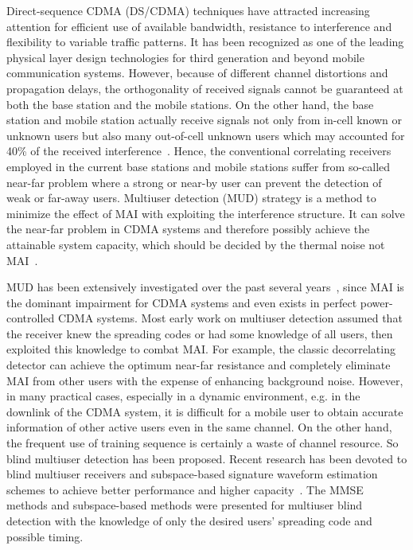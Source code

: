 \documentclass[a4paper,11pt,fleqn]{article}
\begin{document}
Direct-sequence CDMA (DS/CDMA) techniques have attracted
increasing attention for efficient use of available bandwidth,
resistance to interference and flexibility to variable traffic
patterns. It has been recognized as one of the leading physical
layer design technologies for third generation and beyond mobile
communication systems. However, because of different channel
distortions and propagation delays, the orthogonality of received
signals cannot be guaranteed at both the base station and the
mobile stations. On the other hand, the base station and mobile
station actually receive signals not only from in-cell known or
unknown users but also many out-of-cell unknown users which may
accounted for 40\% of the received interference~\cite{Viterbi95}.
Hence, the conventional correlating receivers employed in the
current base stations and mobile stations suffer from so-called
near-far problem where a strong or near-by user can prevent the
detection of weak or far-away users. Multiuser detection (MUD)
strategy is a method to minimize the effect of MAI with exploiting
the interference structure. It can solve the near-far problem in
CDMA systems and therefore possibly achieve the attainable system
capacity, which should be decided by the thermal noise not
MAI~\cite{Verd86}.

MUD has been extensively investigated over the past several
years~\cite{Verd98}, since MAI is the dominant impairment for CDMA
systems and even exists in perfect power-controlled CDMA systems.
Most early work on multiuser detection assumed that the receiver
knew the spreading codes or had some knowledge of all users, then
exploited this knowledge to combat MAI. For example, the classic
decorrelating detector can achieve the optimum near-far resistance
and completely eliminate MAI from other users with the expense of
enhancing background noise. However, in many practical cases,
especially in a dynamic environment, e.g. in the downlink of the
CDMA system, it is difficult for a mobile user to obtain accurate
information of other active users even in the same channel. On the
other hand, the frequent use of training sequence is certainly a
waste of channel resource. So blind multiuser detection has been
proposed. Recent research has been devoted to blind multiuser
receivers and subspace-based signature waveform estimation schemes
to achieve better performance and higher
capacity~\cite{Madh94,Honi95, Poor97, Wang98, Torl97, Liu96}. The
MMSE methods and subspace-based methods were presented for
multiuser blind detection with the knowledge of only the desired
users' spreading code and possible timing.
\end{document}
